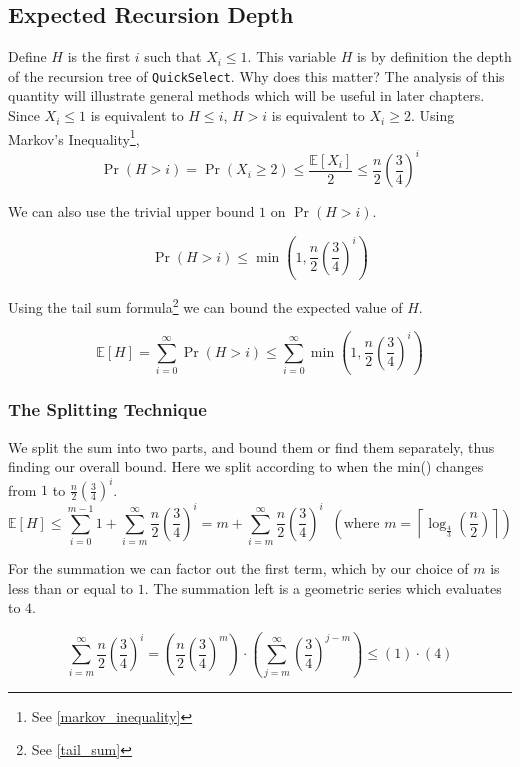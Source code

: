 \subsection{Expected Recursion Depth}

Define $H$ is the first $i$ such that $X_i \le 1$. This variable $H$ is by definition the depth of the 
recursion tree of \texttt{QuickSelect}. Why does this matter? The analysis of this quantity will illustrate 
general methods which will be useful in later chapters.\\


\noindent Since $X_i \le 1$ is equivalent to $H \le i$, $H>i$ is 
equivalent to $X_i \ge 2$. Using Markov's Inequality\footnote{See \autoref{markov_inequality}},
\[
\Pr(H>i)
=
\Pr(X_i\ge2)
\le
\frac{\mathbb E[X_i]}{2} \le \frac n2\left(\frac34\right)^i
\]

We can also use the trivial upper bound $1$ on $\Pr(H>i)$.

\[
\Pr(H>i) \le \min\left(1,\frac n2\left(\frac34\right)^i\right)
\]

\noindent Using the tail sum formula\footnote{See \autoref{tail_sum}} we can bound the expected value of $H$.

\[
\mathbb E[H]
=
\sum_{i=0}^{\infty}\Pr(H>i)
\le
\sum_{i=0}^{\infty}
\min\left(1,\frac n2\left(\frac34\right)^i\right) 
\]

\vspace{0.6em}
\subsubsection*{The Splitting Technique}
We split the sum into two parts, and bound them or find 
them separately, thus finding our overall bound. Here we split according to when 
the min() changes from $1$ to $\frac n2\left(\frac34\right)^i$.\\
\[
\mathbb E[H] \le \sum_{i=0}^{m-1} 1 +
\sum_{i=m}^{\infty} \frac{n}{2} \left( \frac{3}{4} \right)^i
=m+ \sum_{i=m}^{\infty} \frac{n}{2} \left( \frac{3}{4} \right)^i
\;\;\left(\text{where } m= \left\lceil \log_{\frac{4}{3}} \left( \frac{n}{2} \right) \right\rceil\right)
\]

\vspace{1em}
\noindent For the summation we can factor out the first term, which by our choice of $m$ is less 
than or equal to $1$. The summation left is a geometric series which evaluates to $4$.

\[
\sum_{i=m}^{\infty} \frac{n}{2} \left( \frac{3}{4} \right)^i
=
\left( \frac n2\left(\frac34\right)^m \right) \cdot 
\left(\sum_{j=m}^{\infty}\left(\frac34\right)^{j-m}\right)
\le (1) \cdot (4)
\]

